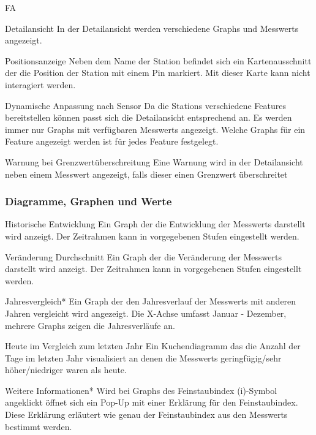 \begin{Kriterien}{FA}
 \item[Detailansicht]
   In der Detailansicht werden verschiedene \glspl{Graph} und \glspl{Messwert} angezeigt. 

 \item[Positionsanzeige]
  Neben dem Name der \gls{Station} befindet sich ein Kartenausschnitt der die Position der \gls{Station} mit einem \gls{Pin} markiert.
  Mit dieser Karte kann nicht interagiert werden.

 \item[Dynamische Anpassung nach Sensor]
   Da die \glspl{Station} verschiedene \glspl{Feature} bereitstellen können passt sich die Detailansicht entsprechend an.
   Es werden immer nur \glspl{Graph} mit verfügbaren \glspl{Messwert} angezeigt.
   Welche \glspl{Graph} für ein \gls{Feature} angezeigt werden ist für jedes \gls{Feature} festgelegt.

 \item[Warnung bei Grenzwertüberschreitung]
  Eine Warnung wird in der Detailansicht neben einem \gls{Messwert} angezeigt, falls dieser einen Grenzwert überschreitet

 \subsubsection*{Diagramme, Graphen und Werte}

 \item[Historische Entwicklung]
   Ein \gls{Graph} der die Entwicklung der \glspl{Messwert} darstellt wird anzeigt.
   Der Zeitrahmen kann in vorgegebenen Stufen eingestellt werden.
 
 \item[Veränderung Durchschnitt]
   Ein Graph der die Veränderung der \glspl{Messwert} darstellt wird anzeigt.
   Der Zeitrahmen kann in vorgegebenen Stufen eingestellt werden.

 \item[Jahresvergleich*]
   Ein Graph der den Jahresverlauf der \glspl{Messwert} mit anderen Jahren vergleicht wird angezeigt.
   Die X-Achse umfasst Januar - Dezember, mehrere \glspl{Graph} zeigen die Jahresverläufe an.

 \item[Heute im Vergleich zum letzten Jahr]
   Ein \gls{Kuchendiagramm} das die Anzahl der Tage im letzten Jahr visualisiert an denen die \glspl{Messwert} geringfügig/sehr höher/niedriger waren als heute.

 \item[Weitere Informationen*]
   Wird bei \glspl{Graph} des \gls{Feinstaubindex} (i)-Symbol angeklickt öffnet sich ein \gls{Pop-Up} mit einer Erklärung für den \gls{Feinstaubindex}.
   Diese Erklärung erläutert wie genau der \gls{Feinstaubindex} aus den \glspl{Messwert} bestimmt werden.


\end{Kriterien}
